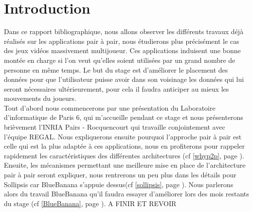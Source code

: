 \section{Introduction}
	Dans ce rapport bibliographique, nous allons observer les différents travaux déjà réalisés sur les applications pair à pair, nous étudierons plus précisément le cas des jeux vidéos massivement multijoueur. Ces applications induisent une bonne montée en charge si l'on veut qu'elles soient utilisées par un grand nombre de personne en même temps. Le but du stage est d'améliorer le placement des données pour que l'utilisateur puisse avoir dans son voisinage les données qui lui seront nécessaires ultérieurement, pour cela il faudra anticiper au mieux les mouvements du joueurs.\\

	Tout d'abord nous commencerons par une présentation du Laboratoire d'informatique de Paris 6, qui m'accueille pendant ce stage et nous présenterons brièvement l'INRIA Pairs - Rocquencourt qui travaille conjointement avec l'équipe REGAL. Nous expliquerons ensuite pourquoi l'approche pair à pair est celle qui est la plus adaptée à ces applications, nous en profiterons pour rappeler rapidement les caractéristiques des différentes architectures (cf \ref{whyp2p}, page \pageref{whyp2p}). Ensuite, les mécanismes permettant une meilleure mise en place de l'architecture pair à pair seront expliquer, nous rentrerons un peu plus dans les détails pour Sollipsis car BlueBanana s'appuie dessus(cf \ref{sollipsis}, page \pageref{sollipsis}). Nous parlerons alors du travail BlueBanana qu'il faudra essayer d'améliorer lors des mois restants du stage (cf \ref{BlueBanana}, page \pageref{BlueBanana}). A FINIR ET REVOIR

